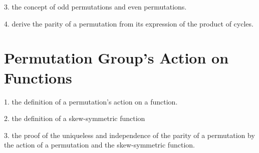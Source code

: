 \documentclass{ctexart}
\begin{document}
3. the concept of odd permutations and even permutations.

4. derive the parity of a permutation from its expression of the product of 
cycles.

\section{Permutation Group's Action on Functions}

1. the definition of a permutation's action on a function.

2. the definition of a skew-symmetric function

3. the proof of the uniqueless and independence of the parity of a permutation 
by the action of a permutation and the skew-symmetric function.
\end{document}
